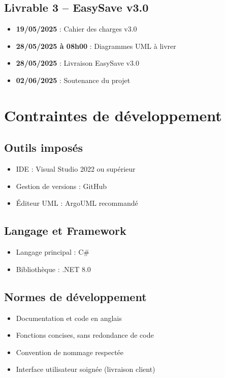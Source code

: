 \documentclass[12pt]{article}
\begin{document}
\subsection*{Livrable 3 – EasySave v3.0}
\begin{itemize}
    \item \textbf{19/05/2025} : Cahier des charges v3.0
    \item \textbf{28/05/2025 à 08h00} : Diagrammes UML à livrer
    \item \textbf{28/05/2025} : Livraison EasySave v3.0
    \item \textbf{02/06/2025} : Soutenance du projet
\end{itemize}

\section{Contraintes de développement}
\subsection*{Outils imposés}
\begin{itemize}
    \item IDE : Visual Studio 2022 ou supérieur
    \item Gestion de versions : GitHub
    \item Éditeur UML : ArgoUML recommandé
\end{itemize}

\subsection*{Langage et Framework}
\begin{itemize}
    \item Langage principal : C\#
    \item Bibliothèque : .NET 8.0
\end{itemize}

\subsection*{Normes de développement}
\begin{itemize}
    \item Documentation et code en anglais
    \item Fonctions concises, sans redondance de code
    \item Convention de nommage respectée
    \item Interface utilisateur soignée (livraison client)
\end{itemize}
\end{document}
